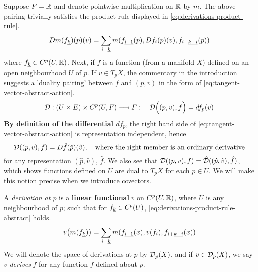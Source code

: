 \documentclass[../main-v2-manifolds.tex]{subfiles}
\begin{document}
Suppose $F = \mathbb{R}$ and denote pointwise multiplication on $\mathbb{R}$ by $m$. The above pairing trivially satisfies the product rule displayed in \cref{eq:derivations-product-rule}.
\begin{equation}\label{eq:derivations-product-rule}
    Dm(\UL{f}[k])(p)(v) = \sum_{i=\underline{k}}m(\UL{f}[i-1](p),D f_i(p)(v),\UL{f}[i+][k-i](p))
\end{equation}
where $\UL{f}[k]\in C^p(U,\real)$. Next, if $f$ is a function (from a manifold $X$) defined on an open neighbourhood $U$ of $p$. If $v\in T_p X$, the commentary in the introduction suggests a 'duality pairing' between $f$ and $(p,v)$ in the form of \cref{eq:tangent-vector-abstract-action}.
\begin{equation}\label{eq:tangent-vector-abstract-action}
    \mathcal{D}: (U\times E)\times C^p(U,F)\longrightarrow F:\quad \mathcal{D}\qty\Big((p,v),f) = df_p(v)
\end{equation}
\textbf{By definition of the differential $df_p$}, the right hand side of \cref{eq:tangent-vector-abstract-action} is representation independent, hence
\begin{equation}\label{eq:tangent-vector-concrete-action}
    \mathcal{D}((p,v), f) =  D\hat{f}(\hat{p})(\hat{v}),\quad\text{where the right member is an ordinary derivative}
\end{equation}
for any representation $(\hat{p},\hat{v})$, $\hat{f}$. We also see that $\mathcal{D}((p,v), f) = \hat{\mathcal{D}}((\hat{p},\hat{v}),\hat{f})$, which shows functions defined on $U$ are dual to $T_p X$ for each $p\in U$. We will make this notion precise when we introduce covectors.

\begin{definition}[Derivation at $p$]\label{def:derivation-at-p}
A \emph{derivation at $p$} is a \textbf{linear functional} $v$ on $C^p(U,\mathbb{R})$, where $U$ is any neighbourhood of $p$; such that for $\UL{f}[k]\in C^p(U)$, \cref{eq:derivations-product-rule-abstract} holds. 
\begin{equation}\label{eq:derivations-product-rule-abstract}
    v\qty(m(\UL{f}[k])) = \sum_{i=\underline{k}}m(\UL{f}[i-1](x), v(f_i),\UL{f}[i+][k-i](x))
\end{equation}
We will denote the space of derivations at $p$ by $\mathcal{D}_p(X)$, and if $v\in \mathcal{D}_p(X)$, we say $v$ \emph{derives} $f$ for any function $f$ defined about $p$.
\end{definition}
\end{document}
